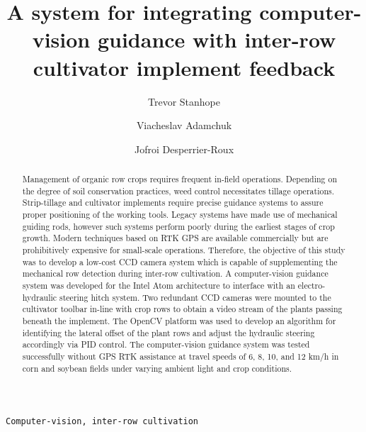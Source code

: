\documentclass[authoryear]{elsarticle}
\begin{document}
\begin{frontmatter}

\title{A system for integrating computer-vision guidance with inter-row cultivator
  implement feedback}
\author[rvt]{Trevor Stanhope}
\author[rvt]{Viacheslav Adamchuk}
\author[els]{Jofroi Desperrier-Roux}

\address[rvt]{McGill University, 21111 Lakeshore Road,
  Sainte-Anne-de-Bellevue, Quebec, Canada}
\address[els]{Agri-Fusion 2000, Inc., 481 Chemine Saint Philippe,
  Saint-Polycarpe, Quebec, Canada}

\begin{abstract}
Management of organic row crops requires frequent in-field
operations. Depending on the degree of soil conservation practices, 
weed control necessitates tillage operations. Strip-tillage and
cultivator implements require precise guidance systems to
assure proper positioning of the working tools. Legacy systems have
made use of mechanical guiding rods, however such
systems perform poorly during the earliest stages of crop growth.
Modern techniques based on RTK GPS are available commercially but are
prohibitively expensive for small-scale operations.
Therefore, the objective of this study was to develop a low-cost CCD 
camera system which is capable of supplementing the mechanical row
detection during inter-row cultivation.
A computer-vision guidance system was developed for the Intel Atom 
architecture to interface with an electro-hydraulic steering hitch system.
Two redundant CCD cameras were mounted to the cultivator toolbar
in-line with crop rows to obtain a video stream of the plants passing
beneath the implement. The OpenCV platform was used to develop an
algorithm for identifying the lateral offset of the plant rows and
adjust the hydraulic steering accordingly via PID control. The
computer-vision guidance system was tested successfully without GPS
RTK assistance at travel speeds of 6, 8, 10, and 12 km/h in corn and
soybean fields under varying ambient light and crop conditions.
\end{abstract}

\begin{keyword}
\texttt{Computer-vision, inter-row cultivation}
\end{keyword}

\end{frontmatter}
\end{document}
